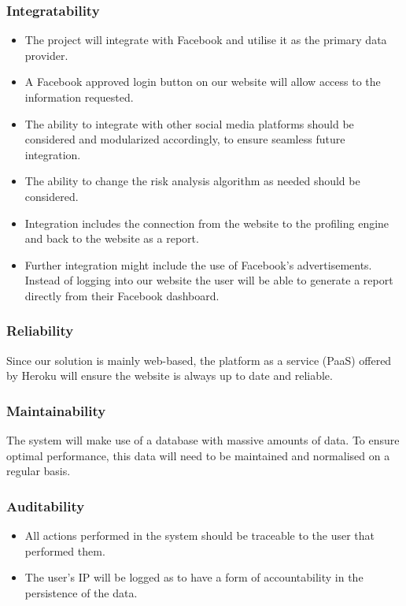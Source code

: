 \documentclass{article}
\begin{document}
		\subsubsection{Integratability}\label{subsubsec:integratability}
		\begin{itemize}
			\item The project will integrate with Facebook and utilise it as the primary data provider.
			\item A Facebook approved login button on our website will allow access to the information requested. 
			\item The ability to integrate with other social media platforms should be considered and modularized accordingly, to ensure seamless future integration. 
			\item The ability to change the risk analysis algorithm as needed should be considered.
			\item Integration includes the connection from the website to the profiling engine and back to the website as a report.
			\item Further integration might include the use of Facebook's advertisements. Instead of logging into our website the user will be able to generate a report directly from their Facebook dashboard.
		\end{itemize}		

		\subsubsection{Reliability}
			Since our solution is mainly web-based, the platform as a service (PaaS) offered by Heroku will ensure the website is always up to date and reliable.

		\subsubsection{Maintainability}
			The system will make use of a database with massive amounts of data. To ensure optimal performance, this data will need to be maintained and normalised on a regular basis.

		\subsubsection{Auditability}
		\begin{itemize}
			\item All actions performed in the system should be traceable to the user that performed them.
			\item The user's IP  will be logged as to have a form of accountability in the persistence of the data.
		\end{itemize}
\end{document}

